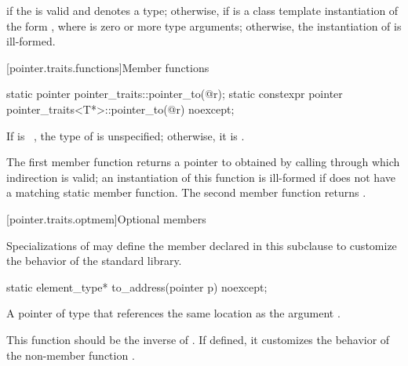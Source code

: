 \begin{itemdescr}
\pnum
\templalias {} if
the   is valid and denotes a
type; otherwise,
 if
 is a class template instantiation of the form ,
where  is zero or more type arguments; otherwise, the instantiation of
 is ill-formed.
\end{itemdescr}

[pointer.traits.functions]{Member functions}

%
\begin{itemdecl}
static pointer pointer_traits::pointer_to(@\seebelow@ r);
static constexpr pointer pointer_traits<T*>::pointer_to(@\seebelow@ r) noexcept;
\end{itemdecl}

\begin{itemdescr}
\pnum
\remarks If  is \cv{}~, the type of
 is unspecified; otherwise, it is .

\pnum
\returns The first member function returns a pointer to 
obtained by calling  through which
indirection is valid; an instantiation of this function is
ill-formed if  does not have a matching  static member
function. The second member function returns .
\end{itemdescr}

[pointer.traits.optmem]{Optional members}

\pnum
Specializations of  may define the member declared
in this subclause to customize the behavior of the standard library.

%
\begin{itemdecl}
static element_type* to_address(pointer p) noexcept;
\end{itemdecl}

\begin{itemdescr}
\pnum
\returns
A pointer of type  that references
the same location as the argument .

\pnum
\begin{note}
This function should be the inverse of .
If defined, it customizes the behavior of
the non-member function
.
\end{note}
\end{itemdescr}

